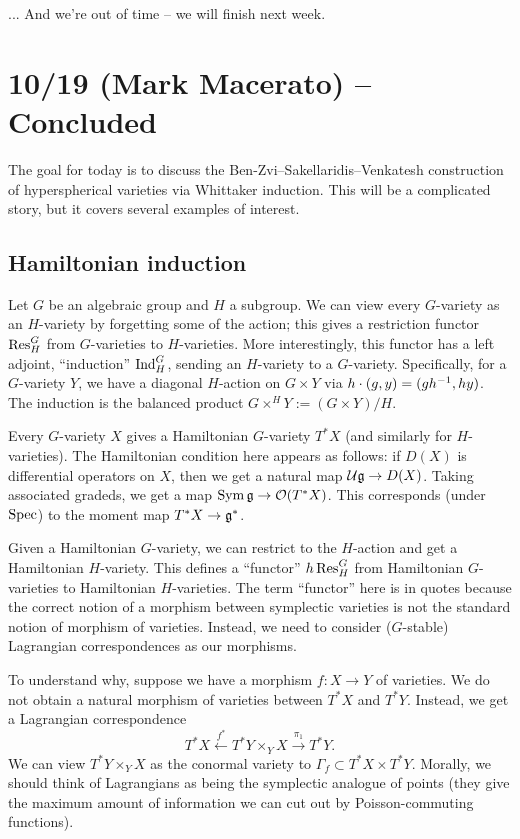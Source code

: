 \documentclass{article}
\begin{document}
... And we're out of time -- we will finish next week.

\section{10/19 (Mark Macerato) -- Concluded}

The goal for today is to discuss the Ben-Zvi--Sakellaridis--Venkatesh construction of hyperspherical varieties via Whittaker induction.
This will be a complicated story, but it covers several examples of interest.

\subsection{Hamiltonian induction}

Let $G$ be an algebraic group and $H$ a subgroup.
We can view every $G$-variety as an $H$-variety by forgetting some of the action; this gives a restriction functor $\operatorname{Res}_H^G$ from $G$-varieties to $H$-varieties.
More interestingly, this functor has a left adjoint, ``induction'' $\operatorname{Ind}_H^G$, sending an $H$-variety to a $G$-variety.
Specifically, for a $G$-variety $Y$, we have a diagonal $H$-action on $G \times Y$ via $h \cdot (g, y) = (g h^{-1}, h y)$.
The induction is the balanced product $G \times^H Y := (G \times Y) / H$.

Every $G$-variety $X$ gives a Hamiltonian $G$-variety $T^* X$ (and similarly for $H$-varieties).
The Hamiltonian condition here appears as follows: if $D(X)$ is differential operators on $X$, then we get a natural map $\mathcal{U} \mathfrak{g} \to D(X)$.
Taking associated gradeds, we get a map $\operatorname{Sym} \mathfrak{g} \to \mathcal{O}(T^* X)$.
This corresponds (under $\operatorname{Spec}$) to the moment map $T^* X \to \mathfrak{g}^*$.

Given a Hamiltonian $G$-variety, we can restrict to the $H$-action and get a Hamiltonian $H$-variety.
This defines a ``functor'' $h\operatorname{Res}_H^G$ from Hamiltonian $G$-varieties to Hamiltonian $H$-varieties.
The term ``functor'' here is in quotes because the correct notion of a morphism between symplectic varieties is not the standard notion of morphism of varieties.
Instead, we need to consider ($G$-stable) Lagrangian correspondences as our morphisms.

To understand why, suppose we have a morphism $f: X \to Y$ of varieties.
We do not obtain a natural morphism of varieties between $T^*X$ and $T^*Y$.
Instead, we get a Lagrangian correspondence
\[
	T^*X \xleftarrow{f^*} T^*Y \times_Y X \xrightarrow{\pi_1} T^*Y.
\]
We can view $T^*Y \times_Y X$ as the conormal variety to $\Gamma_f \subset T^*X \times T^*Y$.
Morally, we should think of Lagrangians as being the symplectic analogue of points (they give the maximum amount of information we can cut out by Poisson-commuting functions).
\end{document}
